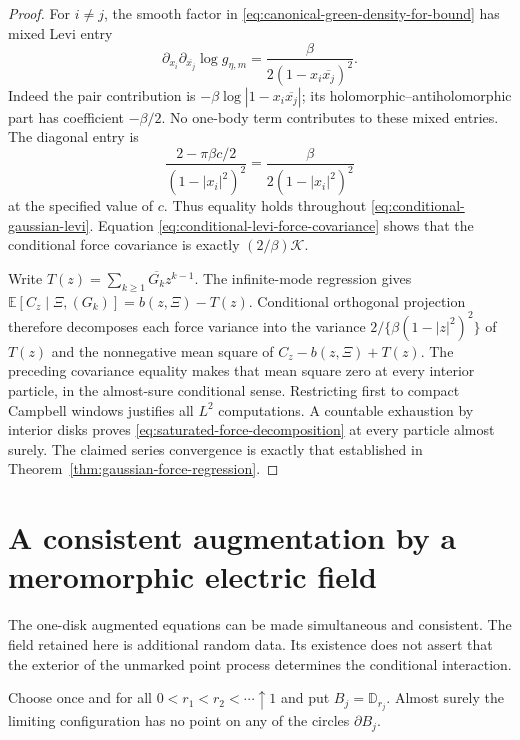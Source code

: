 \documentclass[11pt,a4paper]{article}
\numberwithin{equation}{section}
\theoremstyle{definition}
\theoremstyle{remark}
\newcommand{\D}{\mathbb D}
\begin{document}
\begin{proof}
For $i\ne j$, the smooth factor in
\eqref{eq:canonical-green-density-for-bound} has mixed Levi entry
\[
 \partial_{x_i}\partial_{\overline{x_j}}\log g_{\eta,m}
          =\frac\beta{2(1-x_i\overline{x_j})^2}.
\]
Indeed the pair contribution is
$-\beta\log|1-x_i\overline{x_j}|$; its holomorphic--antiholomorphic
part has coefficient $-\beta/2$. No one-body term contributes to
these mixed entries. The diagonal entry is
\[
 \frac{2-\pi\beta c/2}{(1-|x_i|^2)^2}
       =\frac\beta{2(1-|x_i|^2)^2}
\]
at the specified value of $c$. Thus equality holds throughout
\eqref{eq:conditional-gaussian-levi}. Equation
\eqref{eq:conditional-levi-force-covariance} shows that the conditional
force covariance is exactly $(2/\beta)\mathcal K$.

Write $T(z)=\sum_{k\ge1}\overline{G_k}z^{k-1}$. The infinite-mode
regression gives
$\mathbb E[C_z\mid\Xi,(G_k)]=b(z,\Xi)-T(z)$.
Conditional orthogonal projection therefore decomposes each force
variance into the variance $2/\{\beta(1-|z|^2)^2\}$ of $T(z)$ and
the nonnegative mean square of
$C_z-b(z,\Xi)+T(z)$. The preceding covariance equality makes that
mean square zero at every interior particle, in the almost-sure
conditional sense. Restricting first to compact Campbell windows
justifies all $L^2$ computations. A countable exhaustion by interior
disks proves \eqref{eq:saturated-force-decomposition} at every
particle almost surely. The claimed series convergence is exactly
that established in Theorem~\ref{thm:gaussian-force-regression}.
\end{proof}

\section{A consistent augmentation by a meromorphic electric field}
\label{sec:consistent-meromorphic-augmentation}

The one-disk augmented equations can be made simultaneous and
consistent. The field retained here is additional random data. Its
existence does not assert that the exterior of the unmarked point
process determines the conditional interaction.

Choose once and for all $0<r_1<r_2<\cdots\uparrow1$ and put
$B_j=\D_{r_j}$. Almost surely the limiting configuration has no point
on any of the circles $\partial B_j$.
\end{document}
